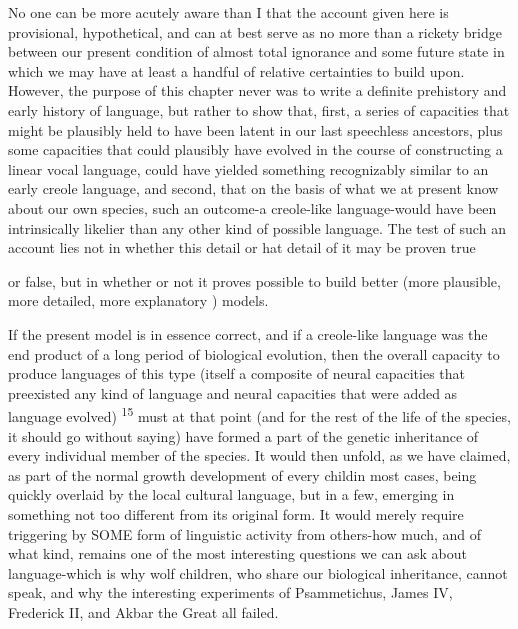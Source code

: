 No one can be more acutely aware than I that the account given here is provisional, hypothetical, and can at best serve as no more than a rickety bridge between our present condition of almost total ignor\-ance and some future state in which we may have at least a handful of relative certainties to build upon. However, the purpose of this chapter never was to write a definite prehistory and early history of language, but rather to show that, first, a series of capacities that might be plausibly held to have been latent in our last speechless ancestors, plus some capacities that could plausibly have evolved in the course of constructing a linear vocal language, could have yielded something recognizably similar to an early creole language, and second, that on the basis of what we at present know about our own species, such an outcome-a creole-like language-would have been intrinsically likelier than any other kind of possible language. The test of such an account lies not in whether this detail or hat detail of it may be proven true


or false, but in whether or not it proves possible to build better (more plausible, more detailed, more explanatory ) models.

If the present model is in essence correct, and if a creole-like language was the end product of a long period of biological evolution, then the overall capacity to produce languages of this type (itself a composite of neural capacities that preexisted any kind of language and neural capacities that were added as language evolved) \textsuperscript{1}\textsuperscript{5} must at that point (and for the rest of the life of the species, it should go without saying) have formed a part of the genetic inheritance of every individual member of the species. It would then unfold, as we have claimed, as part of the normal growth development of every child\-in most cases, being quickly overlaid by the local cultural language, but in a few, emerging in something not too different from its original form. It would merely require triggering by SOME form of linguistic activity from others-how much, and of what kind, remains one of the most interesting questions we can ask about language-which is why wolf children, who share our biological inheritance, cannot speak, and why the interesting experiments of Psammetichus, James IV, Frederick II, and Akbar the Great all failed.

